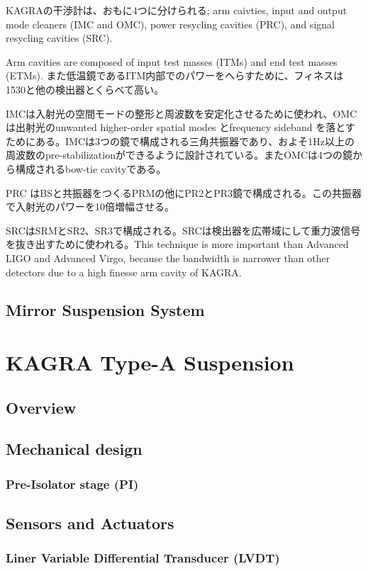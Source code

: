 KAGRAの干渉計は、おもに4つに分けられる; arm caivties, input and output mode cleaners (IMC and OMC), power resycling cavities (PRC), and signal resycling cavities (SRC).

Arm cavities are composed of input test masses (ITMs) and end test masses (ETMs). また低温鏡であるITM内部でのパワーをへらすために、フィネスは1530と他の検出器とくらべて高い。

IMCは入射光の空間モードの整形と周波数を安定化させるために使われ、OMCは出射光のunwanted higher-order spatial modes とfrequency sideband を落とすためにある。IMCは3つの鏡で構成される三角共振器であり、およそ1Hz以上の周波数のpre-stabilizationができるように設計されている。またOMCは4つの鏡から構成されるbow-tie cavityである。

PRC はBSと共振器をつくるPRMの他にPR2とPR3鏡で構成される。この共振器で入射光のパワーを10倍増幅させる。

SRCはSRMとSR2、SR3で構成される。SRCは検出器を広帯域にして重力波信号を抜き出すために使われる。This technique is more important than Advanced LIGO and Advanced Virgo, because the bandwidth is narrower than other detectors due to a high finesse arm cavity of KAGRA. 



\subsection{Mirror Suspension System}

\section{KAGRA Type-A Suspension}
\subsection{Overview}

\subsection{Mechanical design}
\subsubsection{Pre-Isolator stage (PI)}

\subsection{Sensors and Actuators}
\subsubsection{Liner Variable Differential Transducer (LVDT)}
